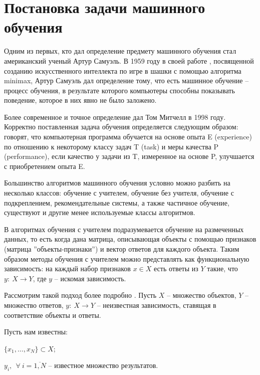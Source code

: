 \section{Постановка задачи машинного обучения}

Одним из первых, кто дал определение предмету машинного обучения стал американский ученый Артур Самуэль. В 1959 году в своей работе \cite{Samuel:ML}, посвященной созданию искусственного интеллекта по игре в шашки с помощью алгоритма minimax, Артур Самуэль дал определение тому, что есть машинное обучение -- процесс обучения, в результате которого компьютеры способны показывать поведение, которое в них явно не было заложено.

Более современное и точное определение дал Том Митчелл в 1998 году. Корректно поставленная задача обучения определяется следующим образом: говорят, что компьютерная программа обучается на основе опыта E (experience) по отношению к некоторому классу задач T (task) и меры качества P (performance), если качество у задачи из T, измеренное на основе P, улучшается с приобретением опыта E.

Большинство алгоритмов машинного обучения условно можно разбить на несколько классов: обучение с учителем, обучение без учителя, обучение с подкреплением, рекомендательные системы, а также частичное обучение, существуют и другие менее используемые классы алгоритмов.

В алгоритмах обучения с учителем подразумевается обучение на размеченных данных, то есть когда дана матрица, описывающая объекты с помощью признаков (матрица ''объекты-признаки'') и вектор ответов для каждого объекта. Таким образом методы обучения с учителем можно представлять как функциональную зависимость: на каждый набор признаков $x \in X$ есть ответы из $Y$ такие, что $y:~X \rightarrow Y$, где $y$ -- искомая зависимость.

Рассмотрим такой подход более подробно \cite{coursera:voroncov}. Пусть $X$ -- множество объектов, $Y$ -- множество ответов, $y:~X \rightarrow Y$ -- неизвестная зависимость, ставящая в соответствие объекты и ответы.

Пусть нам известны:\\
\begin{description}[font=$\bullet$]
    \item $\{ x_1, \dots, x_N \} \subset X $;
    \item $y_i,~~\forall~i=\overline{1,N}$ -- известное множество результатов.
\end{description}

